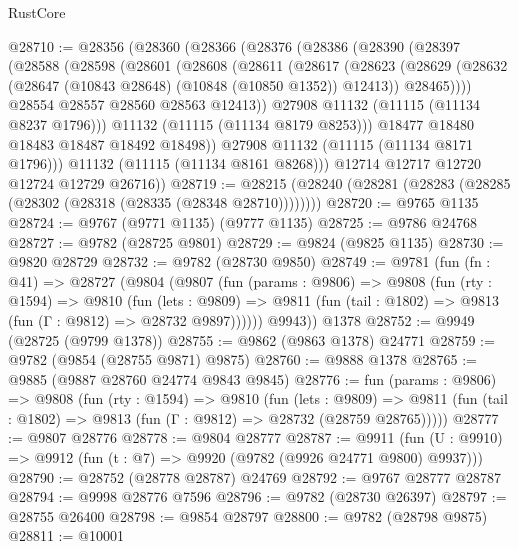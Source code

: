 \begin{lexlean}{RustCore}
\begin{coremodule}
@28710 := @28356
    (@28360
      (@28366
        (@28376
          (@28386
            (@28390
              (@28397
                (@28588
                  (@28598
                    (@28601
                      (@28608
                        (@28611
                          (@28617
                            (@28623
                              (@28629
                                (@28632 (@28647 (@10843 @28648) (@10848 (@10850 @1352)) @12413))
                                @28465))))
                        @28554
                        @28557
                        @28560
                        @28563
                        @12413))
                    @27908
                    @11132
                    (@11115 (@11134 @8237 @1796)))
                  @11132
                  (@11115 (@11134 @8179 @8253)))
                @18477
                @18480
                @18483
                @18487
                @18492
                @18498))
            @27908
            @11132
            (@11115 (@11134 @8171 @1796)))
          @11132
          (@11115 (@11134 @8161 @8268)))
        @12714
        @12717
        @12720
        @12724
        @12729
        @26716))
@28719 := @28215 (@28240 (@28281 (@28283 (@28285 (@28302 (@28318 (@28335 (@28348 @28710))))))))
@28720 := @9765 @1135
@28724 := @9767 (@9771 @1135) (@9777 @1135)
@28725 := @9786 @24768
@28727 := @9782 (@28725 @9801)
@28729 := @9824 (@9825 @1135)
@28730 := @9820 @28729
@28732 := @9782 (@28730 @9850)
@28749 := @9781
    (fun (fn : @41) =>
    @28727
      (@9804
        (@9807
          (fun (params : @9806) =>
          @9808
            (fun (rty : @1594) =>
            @9810
              (fun (lets : @9809) =>
              @9811 (fun (tail : @1802) => @9813 (fun (Γ : @9812) => @28732 @9897))))))
        @9943))
    @1378
@28752 := @9949 (@28725 (@9799 @1378))
@28755 := @9862 (@9863 @1378) @24771
@28759 := @9782 (@9854 (@28755 @9871) @9875)
@28760 := @9888 @1378
@28765 := @9885 (@9887 @28760 @24774 @9843 @9845)
@28776 := fun (params : @9806) =>
  @9808
    (fun (rty : @1594) =>
    @9810
      (fun (lets : @9809) =>
      @9811 (fun (tail : @1802) => @9813 (fun (Γ : @9812) => @28732 (@28759 @28765)))))
@28777 := @9807 @28776
@28778 := @9804 @28777
@28787 := @9911
    (fun (U : @9910) => @9912 (fun (t : @7) => @9920 (@9782 (@9926 @24771 @9800) @9937)))
@28790 := @28752 (@28778 @28787) @24769
@28792 := @9767 @28777 @28787
@28794 := @9998 @28776 @7596
@28796 := @9782 (@28730 @26397)
@28797 := @28755 @26400
@28798 := @9854 @28797
@28800 := @9782 (@28798 @9875)
@28811 := @10001

\end{coremodule}
\end{lexlean}
